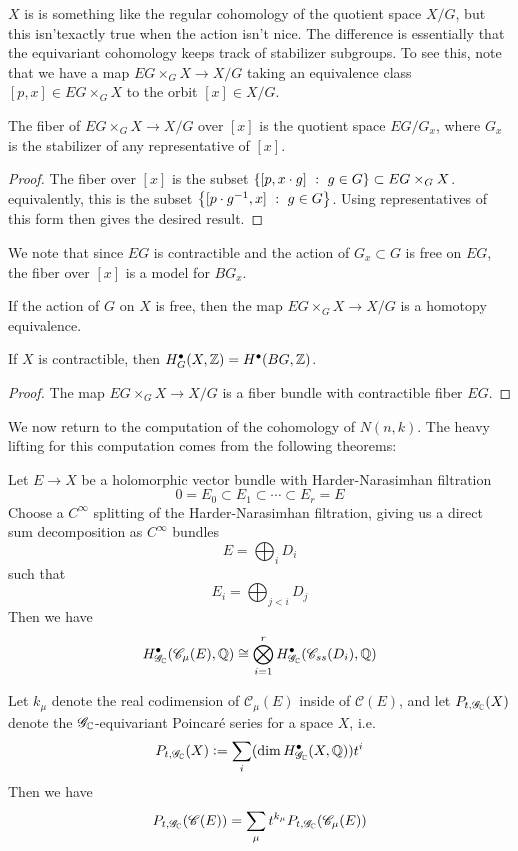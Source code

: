 $X$ is is something like the regular cohomology of the quotient space $X/G$, but
this isn'texactly true when the action isn't nice. The difference is essentially
that the equivariant cohomology keeps track of stabilizer subgroups. To
see this, note that we have a map $EG\times_G X \to X/G$ taking an
equivalence class $[p,x] \in EG\times_G X$ to the orbit $[x] \in X/G$.
%
\begin{prop}
The fiber of $EG\times_G X \to X/G$ over $[x]$ is the quotient space $EG/G_x$, where
$G_x$ is the stabilizer of any representative of $[x]$.
\end{prop}
%
\begin{proof}
The fiber over $[x]$ is the subset $\left\lbrace [p,x\cdot g] ~:~ g \in G \right\rbrace\subset EG \times_G X$.
equivalently, this is the subset $\left\lbrace [p\cdot g^{-1},x] ~:~ g \in G \right\rbrace$. Using
representatives of this form then gives the desired result.
\end{proof}
%
We note that since $EG$ is contractible and the action of $G_x \subset G$
is free on $EG$, the fiber over $[x]$ is a model for $BG_x$.
%
\begin{cor}
If the action of $G$ on $X$ is free, then the map $EG\times_G X \to X/G$
is a homotopy equivalence.
\end{cor}
%
\begin{cor}
If $X$ is contractible, then $H^\bullet_G(X,\mathbb{Z}) = H^\bullet(BG,\mathbb{Z})$.
\end{cor}
%
\begin{proof}
The map $EG\times_G X \to X/G$ is a fiber bundle with contractible fiber $EG$.
\end{proof}
%
We now return to the computation of the cohomology of $N(n,k)$. The heavy
lifting for this computation comes from the following theorems:
%
\begin{thm}
Let $E \to X$ be a holomorphic vector bundle with Harder-Narasimhan filtration
\[
0 = E_0 \subset E_1 \subset \cdots \subset E_r = E
\]
Choose a $C^\infty$ splitting of the Harder-Narasimhan filtration, giving us a direct
sum decomposition as $C^\infty$ bundles
\[
E = \bigoplus_i D_i
\]
such that
\[
E_i = \bigoplus_{j < i} D_j
\]
Then we have
\[
H^\bullet_{\mathscr{G}_{\mathbb{C}}}(\mathscr{C}_\mu(E),\mathbb{Q}) \cong
\bigotimes_{i=1}^r H^\bullet_{\mathscr{G}_{\mathbb{C}}}(\mathscr{C}_{ss}(D_i),\mathbb{Q})
\]
\end{thm}
%
\begin{thm}
Let $k_\mu$ denote the real codimension of $\mathscr{C}_\mu(E)$ inside
of $\mathscr{C}(E)$, and let $P_{t,\mathscr{G}_{\mathbb{C}}}(X)$ denote the
$\mathscr{G}_{\mathbb{C}}$-equivariant Poincar\'e series for a space $X$, i.e.
\[
P_{t,\mathscr{G}_{\mathbb{C}}}(X) \vcentcolon= \sum_i (\dim H^\bullet_{\mathscr{G}_{\mathbb{C}}}(X,\mathbb{Q}))t^i
\]
Then we have
\[
P_{t,\mathscr{G}_{\mathbb{C}}}(\mathscr{C}(E))
= \sum_\mu t^{k_\mu}P_{t,\mathscr{G}_{\mathbb{C}}}(\mathscr{C}_\mu(E))
\]
\end{thm}

